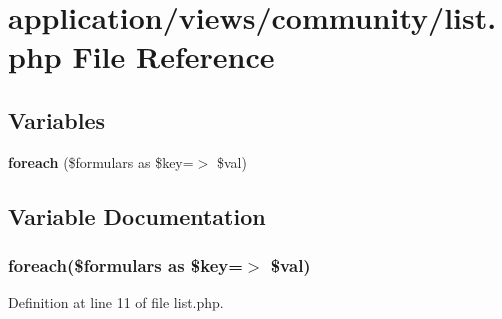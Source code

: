 \section{application/views/community/list.php File Reference}
\label{list_8php}
\subsection*{Variables}
\begin{DoxyCompactItemize}
\item 
{\bf foreach} (\$formulars as \$key=$>$ \$val)
\end{DoxyCompactItemize}


\subsection{Variable Documentation}
\subsubsection[{foreach}]{\setlength{\rightskip}{0pt plus 5cm}foreach(\$formulars as \$key=$>$ \$val)}\label{list_8php_a58236cd338e9e5c3a603f5be54ed6b4b}


Definition at line 11 of file list.\-php.

